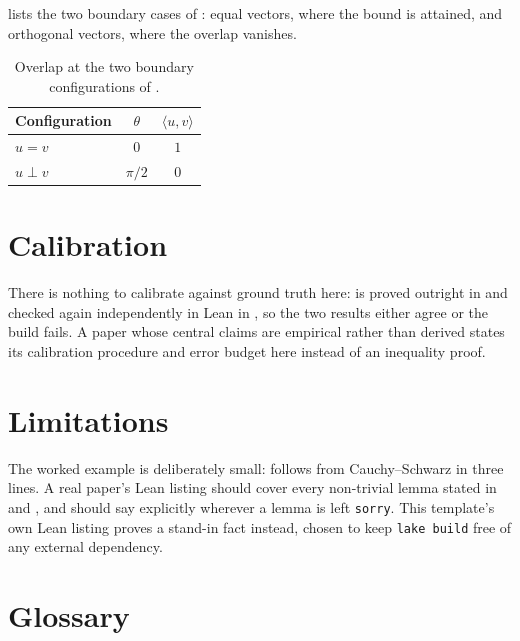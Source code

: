 \documentclass[11pt]{article}
\begin{document}
 lists the two boundary cases of : equal
vectors, where the bound is attained, and orthogonal vectors, where the
overlap vanishes.

\begin{table}[htbp]
  \centering
  \caption{Overlap at the two boundary configurations of .}
  \label{tab:example}
  \begin{tabular}{@{}lcc@{}}
    \toprule
    Configuration & $\theta$ & $\langle u, v \rangle$ \\
    \midrule
    $u = v$            & $0$       & $1$ \\
    $u \perp v$         & $\pi/2$   & $0$ \\
    \bottomrule
  \end{tabular}
\end{table}

\section{Calibration}
\label{sec:calibration}

There is nothing to calibrate against ground truth here: 
is proved outright in  and checked again independently in
Lean in , so the two results either agree or the build
fails. A paper whose central claims are empirical rather than derived
states its calibration procedure and error budget here instead of an
inequality proof.

\section{Limitations}
\label{sec:limitations}

The worked example is deliberately small:  follows from
Cauchy--Schwarz in three lines. A real paper's Lean listing should cover
every non-trivial lemma stated in  and ,
and should say explicitly wherever a lemma is left \texttt{sorry}. This
template's own Lean listing proves a stand-in fact instead, chosen to
keep \texttt{lake build} free of any external dependency.

\printbibliography

\appendix

\section{Glossary}
\label{app:glossary}
\end{document}
